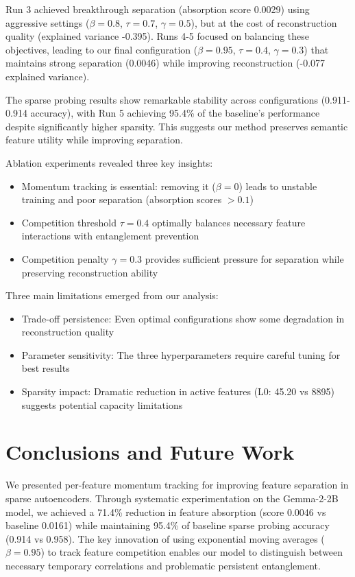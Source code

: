 \documentclass{article} %
\begin{document}
Run 3 achieved breakthrough separation (absorption score 0.0029) using aggressive settings ($\beta=0.8$, $\tau=0.7$, $\gamma=0.5$), but at the cost of reconstruction quality (explained variance -0.395). Runs 4-5 focused on balancing these objectives, leading to our final configuration ($\beta=0.95$, $\tau=0.4$, $\gamma=0.3$) that maintains strong separation (0.0046) while improving reconstruction (-0.077 explained variance).

The sparse probing results show remarkable stability across configurations (0.911-0.914 accuracy), with Run 5 achieving 95.4\% of the baseline's performance despite significantly higher sparsity. This suggests our method preserves semantic feature utility while improving separation.

Ablation experiments revealed three key insights:
\begin{itemize}
    \item Momentum tracking is essential: removing it ($\beta=0$) leads to unstable training and poor separation (absorption scores $>0.1$)
    \item Competition threshold $\tau=0.4$ optimally balances necessary feature interactions with entanglement prevention
    \item Competition penalty $\gamma=0.3$ provides sufficient pressure for separation while preserving reconstruction ability
\end{itemize}

Three main limitations emerged from our analysis:
\begin{itemize}
    \item Trade-off persistence: Even optimal configurations show some degradation in reconstruction quality
    \item Parameter sensitivity: The three hyperparameters require careful tuning for best results
    \item Sparsity impact: Dramatic reduction in active features (L0: 45.20 vs 8895) suggests potential capacity limitations
\end{itemize}

\section{Conclusions and Future Work}
\label{sec:conclusion}

We presented per-feature momentum tracking for improving feature separation in sparse autoencoders. Through systematic experimentation on the Gemma-2-2B model, we achieved a 71.4\% reduction in feature absorption (score 0.0046 vs baseline 0.0161) while maintaining 95.4\% of baseline sparse probing accuracy (0.914 vs 0.958). The key innovation of using exponential moving averages ($\beta=0.95$) to track feature competition enables our model to distinguish between necessary temporary correlations and problematic persistent entanglement.
\end{document}
